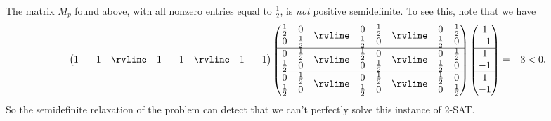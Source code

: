 \begin{ex}
The matrix $M_p$ found above, with all nonzero entries equal to $\frac{1}{2}$, is \emph{not} positive semidefinite. To see this, note that we have
\[
\begin{pmatrix}1 & -1 & \rvline & 1 & -1 & \rvline & 1 & -1\end{pmatrix}
\begin{pmatrix}\begin{matrix} \tfrac{1}{2} & 0\\ 0 & \tfrac{1}{2}\end{matrix} & \rvline & \begin{matrix} 0 & \tfrac{1}{2}\\ \tfrac{1}{2} & 0\end{matrix} & \rvline & \begin{matrix} 0 & \tfrac{1}{2}\\ \tfrac{1}{2} & 0\end{matrix}\\
\hline \begin{matrix} 0 & \tfrac{1}{2}\\ \tfrac{1}{2} & 0\end{matrix} & \rvline & \begin{matrix} \tfrac{1}{2} & 0\\ 0 & \tfrac{1}{2}\end{matrix} & \rvline & \begin{matrix} 0 & \tfrac{1}{2}\\ \tfrac{1}{2} & 0\end{matrix}\\
\hline \begin{matrix} 0 & \tfrac{1}{2}\\ \tfrac{1}{2} & 0\end{matrix} & \rvline & \begin{matrix} 0 & \tfrac{1}{2}\\ \tfrac{1}{2} & 0\end{matrix} & \rvline & \begin{matrix} \tfrac{1}{2} & 0\\ 0 & \tfrac{1}{2}\end{matrix}\end{pmatrix}
\begin{pmatrix} 1\\ -1\\ \hline 1\\ -1\\ \hline 1\\ -1\end{pmatrix} = -3 < 0.
\]
So the semidefinite relaxation of the problem can detect that we can't perfectly solve this instance of 2-SAT.


\end{ex}
